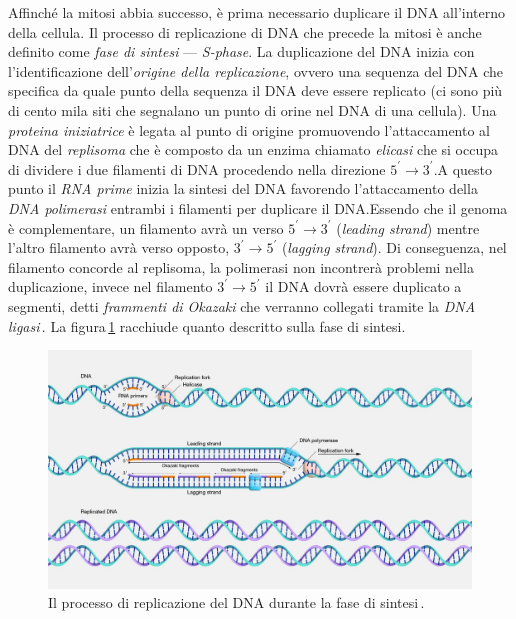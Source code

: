 Affinché la mitosi abbia successo, è prima necessario duplicare il DNA all'interno della cellula. Il processo di replicazione di DNA che precede la mitosi è anche definito come \textsl{fase di sintesi} — \textit{S-phase}. La duplicazione del DNA inizia con l'identificazione dell'\textsl{origine della replicazione}, ovvero una sequenza del DNA che specifica da quale punto della sequenza il DNA deve essere replicato (ci sono più di cento mila siti che segnalano un punto di orine nel DNA di una cellula). Una \textsl{proteina iniziatrice} è legata al punto di origine promuovendo l'attaccamento al DNA del \textsl{replisoma} che è composto da un enzima chiamato \textsl{elicasi} che si occupa di dividere i due filamenti di DNA procedendo nella direzione $5^\prime \to 3^\prime$.\@ A questo punto il \textsl{RNA prime} inizia la sintesi del DNA favorendo l'attaccamento della \textsl{DNA polimerasi} entrambi i filamenti per duplicare il DNA.\@ Essendo che il genoma è complementare, un filamento avrà un verso $5^\prime \to 3^\prime$ (\textit{leading strand}) mentre l'altro filamento avrà verso opposto, $3^\prime \to 5^\prime$ (\textit{lagging strand}). Di conseguenza, nel filamento concorde al replisoma, la polimerasi non incontrerà problemi nella duplicazione, invece nel filamento $3^\prime \to 5^\prime$ il DNA dovrà essere duplicato a segmenti, detti \textsl{frammenti di Okazaki} che verranno collegati tramite la \textsl{DNA ligasi}\,\cite{laskey1989s, bell2002dna, dutta1997initiation, 2017727}. La figura\,\ref{fig:dna-replication} racchiude quanto descritto sulla fase di sintesi.

\begin{figure}[b!]
    \centering
    \includegraphics[width=\textwidth]{assets/dna-replication.jpg}
    \caption[Il processo di replicazione del DNA.]{Il processo di replicazione del DNA durante la fase di sintesi\,\cite{nhgri_dna_replication_image}.}\label{fig:dna-replication}
\end{figure}

